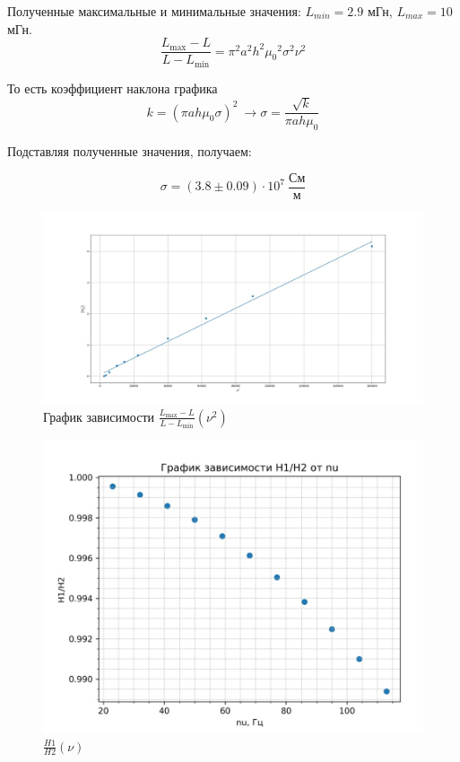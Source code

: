 \documentclass[a4paper, 12pt]{article}
\begin{document}
	Полученные максимальные и минимальные значения: $L_{min} = 2.9$ мГн, $L_{max} = 10$ мГн.
	\begin{equation*}
		\frac{L_{\max} - L}{L - L_{\min}} = \pi ^2 a^2 h^2 {\mu_0}^2 \sigma^2 \nu^2
	\end{equation*}
	
	То есть коэффициент наклона графика
	\[k = (\pi ah\mu_0 \sigma)^2 \ \rightarrow \sigma = \frac{\sqrt{k}}{\pi ah \mu_0}\]
	
	Подставляя полученные значения, получаем:
	
	\begin{equation}
		\sigma = (3.8 \pm 0.09) \cdot 10^7  \ \frac{\text{См}}{\text{м}}
	\end{equation}
        \begin{figure}[H]
		\centering
		\includegraphics[width = \textwidth]{photo_2024-12-06_22-33-53.jpg}
		\caption{График зависимости $\frac{L_{\max} - L}{L - L_{\min}}(\nu^2)$}
	\end{figure}
        \begin{figure}[H]
		\centering
		\includegraphics[width = \textwidth]{-wZvteBMPL8.jpg}
		\caption{$\frac{H1}{H2}(\nu)$}
	\end{figure}
\end{document}
